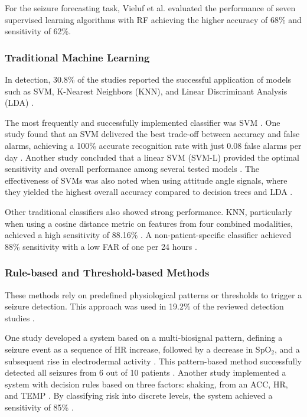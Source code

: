 For the seizure forecasting task, Vieluf et al. \cite{Vieluf2023-zv} evaluated the performance of seven supervised learning algorithms with RF achieving the higher accuracy of 68\% and sensitivity of 62\%.


\subsubsection{Traditional Machine Learning}
In detection, 30.8\% of the studies reported the successful application of models such as SVM, K-Nearest Neighbors (KNN), and Linear Discriminant Analysis (LDA) \cite{Milosevic2016-ee, Hamlin2021-sd, Poh2012-af, Ge2023-ab, Li2022-ty, Xu2022-tx, Wang2025-my, De_Cooman2018-pq}.

The most frequently and successfully implemented classifier was SVM \cite{Milosevic2016-ee, De_Cooman2018-pq, Poh2012-af, Ge2023-ab, Li2022-ty, Xu2022-tx, Wang2025-my}. One study found that an SVM delivered the best trade-off between accuracy and false alarms, achieving a 100\% accurate recognition rate with just 0.08 false alarms per day \cite{Xu2022-tx}. Another study concluded that a linear SVM (SVM-L) provided the optimal sensitivity and overall performance among several tested models \cite{Wang2025-my}. The effectiveness of SVMs was also noted when using attitude angle signals, where they yielded the highest overall accuracy compared to decision trees and LDA \cite{Wang2025-ql}.

Other traditional classifiers also showed strong performance. KNN, particularly when using a cosine distance metric on features from four combined modalities, achieved a high sensitivity of 88.16\% \cite{Ge2023-ab}. A non-patient-specific classifier achieved 88\% sensitivity with a low FAR of one per 24 hours \cite{Poh2012-af}.


\subsubsection{Rule-based and Threshold-based Methods}
These methods rely on predefined physiological patterns or thresholds to trigger a seizure detection. This approach was used in 19.2\% of the reviewed detection studies \cite{Cogan2017-lg, Ali2020-ke, Hegarty-Craver2021-hk, Gheryani2017-yg, Arends2018-ew}.

One study developed a system based on a multi-biosignal pattern, defining a seizure event as a sequence of HR increase, followed by a decrease in SpO$_2$, and a subsequent rise in electrodermal activity \cite{Cogan2017-lg}. This pattern-based method successfully detected all seizures from 6 out of 10 patients \cite{Cogan2017-lg}. Another study implemented a system with decision rules based on three factors: shaking, from an ACC, HR, and TEMP \cite{Ali2020-ke}. By classifying risk into discrete levels, the system achieved a sensitivity of 85\% \cite{Ali2020-ke}. 

